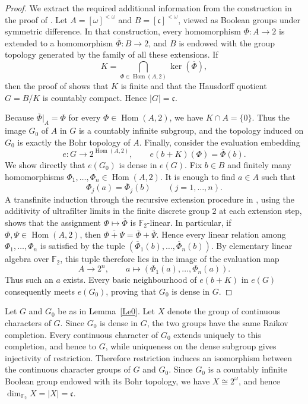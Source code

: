 \documentclass[12pt]{amsart}
\theoremstyle{definition}
\numberwithin{equation}{section}
\theoremstyle{remark}
\begin{document}
\begin{proof}
We extract the required additional information from the construction in the proof of \cite[Theorem~4.1]{HMRS}. Let
$A=[\omega]^{<\omega}$ and $B=[\mathfrak c]^{<\omega}$, viewed as Boolean groups under symmetric difference. In that construction, every homomorphism $\Phi:A\to 2$ is extended to a homomorphism $\overline\Phi:B\to 2$, and $B$ is endowed with the group topology generated by the family of all these extensions. If
\[
K=\bigcap_{\Phi\in\operatorname{Hom}(A,2)}\ker(\overline\Phi),
\]
then the proof of \cite[Theorem~4.1]{HMRS} shows that $K$ is finite and that the Hausdorff quotient
$G=B/K$ is countably compact. Hence $|G|=\mathfrak c$.

Because $\overline\Phi|_A=\Phi$ for every $\Phi\in\operatorname{Hom}(A,2)$, we have $K\cap A=\{0\}$. Thus the image $G_0$ of $A$ in $G$ is a countably infinite subgroup, and the topology induced on $G_0$ is exactly the Bohr topology of $A$. Finally, consider the evaluation embedding
\[
e:G\longrightarrow 2^{\operatorname{Hom}(A,2)},
\qquad
e(b+K)(\Phi)=\overline\Phi(b).
\]
We show directly that $e(G_0)$ is dense in $e(G)$. Fix $b\in B$ and finitely many homomorphisms $\Phi_1,\ldots,\Phi_n\in\operatorname{Hom}(A,2)$. It is enough to find $a\in A$ such that
\[
\Phi_j(a)=\overline\Phi_j(b)\qquad (j=1,\ldots,n).
\]
A transfinite induction through the recursive extension procedure in \cite[Theorem~4.1]{HMRS}, using the additivity of ultrafilter limits in the finite discrete group $2$ at each extension step, shows that the assignment $\Phi\mapsto\overline\Phi$ is $\mathbb F_2$-linear. In particular, if $\Phi,\Psi\in\operatorname{Hom}(A,2)$, then
$\overline{\Phi+\Psi}=\overline\Phi+\overline\Psi$. Hence every linear relation among $\Phi_1,\ldots,\Phi_n$ is satisfied by the tuple
$(\overline\Phi_1(b),\ldots,\overline\Phi_n(b))$. By elementary linear algebra over $\mathbb F_2$, this tuple therefore lies in the image of the evaluation map
\[
A\longrightarrow 2^n,
\qquad
a\longmapsto(\Phi_1(a),\ldots,\Phi_n(a)).
\]
Thus such an $a$ exists. Every basic neighbourhood of $e(b+K)$ in $e(G)$ consequently meets $e(G_0)$, proving that $G_0$ is dense in $G$.
\end{proof}

Let $G$ and $G_0$ be as in Lemma~\ref{Le0}. Let $X$ denote the group of continuous characters of $G$. Since $G_0$ is dense in $G$, the two groups have the same Raikov completion. Every continuous character of $G_0$ extends uniquely to this completion, and hence to $G$, while uniqueness on the dense subgroup gives injectivity of restriction. Therefore restriction induces an isomorphism between the continuous character groups of $G$ and $G_0$. Since $G_0$ is a countably infinite Boolean group endowed with its Bohr topology, we have $X\cong 2^\omega$, and hence $\dim_{\mathbb F_2}X=|X|=\mathfrak c$.
\end{document}
